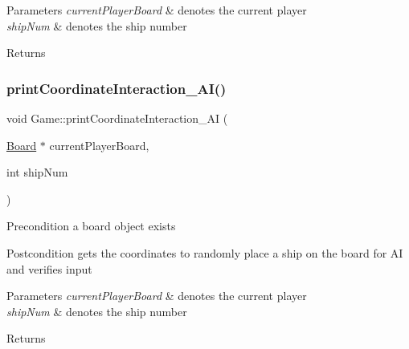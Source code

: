 \begin{DoxyParams}{Parameters}
{\em current\+Player\+Board} & denotes the current player \\
\hline
{\em ship\+Num} & denotes the ship number \\
\hline
\end{DoxyParams}
\begin{DoxyReturn}{Returns}

\end{DoxyReturn}
\mbox{\label{classGame_aa957777f94d7188d59c5bea045b1d52e}} 
\subsubsection{\texorpdfstring{print\+Coordinate\+Interaction\+\_\+\+A\+I()}{printCoordinateInteraction\_AI()}}
{\footnotesize\ttfamily void Game\+::print\+Coordinate\+Interaction\+\_\+\+AI (\begin{DoxyParamCaption}\item[{\hyperlink{classBoard}{Board} $\ast$}]{current\+Player\+Board,  }\item[{int}]{ship\+Num }\end{DoxyParamCaption})}

\begin{DoxyPrecond}{Precondition}
a board object exists 
\end{DoxyPrecond}
\begin{DoxyPostcond}{Postcondition}
gets the coordinates to randomly place a ship on the board for AI and verifies input 
\end{DoxyPostcond}

\begin{DoxyParams}{Parameters}
{\em current\+Player\+Board} & denotes the current player \\
\hline
{\em ship\+Num} & denotes the ship number \\
\hline
\end{DoxyParams}
\begin{DoxyReturn}{Returns}

\end{DoxyReturn}
\mbox{\label{classGame_ac86bc812b7fc44720384167dbe56b964}} 

